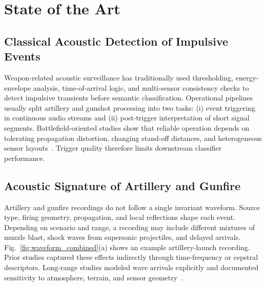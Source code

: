 ﻿\documentclass[conference]{IEEEtran}
\begin{document}
\section{State of the Art}
\subsection{Classical Acoustic Detection of Impulsive Events}
Weapon-related acoustic surveillance has traditionally used thresholding, energy-envelope analysis, time-of-arrival logic, and multi-sensor consistency checks to detect impulsive transients before semantic classification. Operational pipelines usually split artillery and gunshot processing into two tasks: (i) event triggering in continuous audio streams and (ii) post-trigger interpretation of short signal segments. Battlefield-oriented studies show that reliable operation depends on tolerating propagation distortion, changing stand-off distances, and heterogeneous sensor layouts~\cite{desai2005he_cb,desai2006launch_impact,hohil2007variants,dagallier2019long_range}. Trigger quality therefore limits downstream classifier performance.

\subsection{Acoustic Signature of Artillery and Gunfire}
Artillery and gunfire recordings do not follow a single invariant waveform. Source type, firing geometry, propagation, and local reflections shape each event. Depending on scenario and range, a recording may include different mixtures of muzzle blast, shock waves from supersonic projectiles, and delayed arrivals. Fig.~\ref{fig:waveform_combined}(a) shows an example artillery-launch recording. Prior studies captured these effects indirectly through time-frequency or cepstral descriptors. Long-range studies modeled wave arrivals explicitly and documented sensitivity to atmosphere, terrain, and sensor geometry~\cite{dagallier2019long_range}. 
\end{document}
